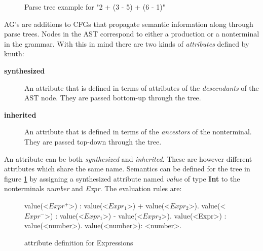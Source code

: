 \documentclass[twoside, titlepage, openright, a4paper]{book}
\begin{document}
\begin{figure}[H]
\centering
{}
\caption{Parse tree example for "2 + (3 - 5) + (6 - 1)"}
\label{fig.example1.parsetree}
\end{figure}

AG's are additions to CFGs that propagate semantic information along through parse trees. Nodes in the AST correspond to either a production or a nonterminal in the grammar. With this in mind there are two kinds of \emph{attributes} defined by knuth\cite{knuth1}:
\begin{description}
\item[\textbf{synthesized}] An attribute that is defined in terms of attributes of the \emph{descendants} of the AST node. They are passed bottom-up through the tree.
\item[\textbf{inherited}] An attribute that is defined in terms of the \emph{ancestors} of the nonterminal. They are passed top-down through the tree.
\end{description}

An attribute can be both \emph{synthesized} and \emph{inherited}. These are however different attributes which share the same name. Semantics can be defined for the tree in figure \ref{fig.example1.parsetree} by assigning a synthesized attribute named \emph{value} of type \textbf{Int} to the nonterminals \emph{number} and \emph{Expr}. The evaluation rules are:

\begin{figure}[H]
\begin{grammar}
value(<$Expr^+$>) : value(<$Expr_1$>) + value(<$Expr_2$>). 
value(<$Expr^-$>) : value(<$Expr_1$>) - value(<$Expr_2$>). 
value(<Expr>) \hspace{5pt} : value(<number>).
value(<number>): <number>.
\end{grammar}
\caption{attribute definition for Expressions}
\label{semantics:bnf:expr}
\end{figure}
\end{document}
